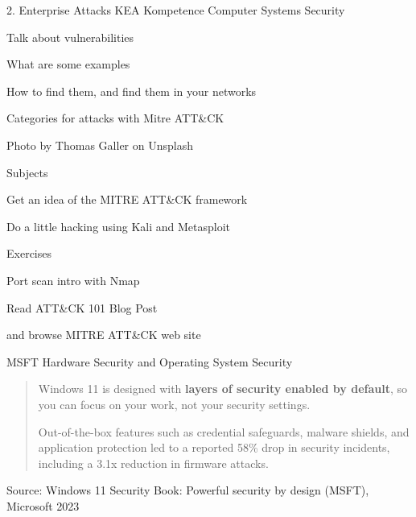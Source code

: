 \documentclass[Screen16to9,17pt]{foils}
\begin{document}
\mytitlepage
{2. Enterprise Attacks}
{KEA Kompetence Computer Systems Security \the\year}





\begin{list2}
\item Talk about vulnerabilities
\item What are some examples
\item How to find them, and find them in your networks
\item Categories for attacks with Mitre ATT\&CK
\end{list2}

{\small\hfill  Photo by Thomas Galler on Unsplash}


\begin{list1}
\item Subjects
\begin{list2}
\item Get an idea of the MITRE ATT\&CK framework
\item Do a little hacking using Kali and Metasploit
\end{list2}
\item Exercises
\begin{list2}
\item Port scan intro with Nmap
\end{list2}
\end{list1}


\begin{list1}
\item Read ATT\&CK 101 Blog Post\\
\item and browse MITRE ATT\&CK web site\\ 
\item MSFT Hardware Security and Operating System Security
\end{list1}




\begin{quote}
Windows 11 is designed with {\bf layers of security
enabled by default}, so you can focus on your work,
not your security settings.

Out-of-the-box features such as credential safeguards, malware shields, and
application protection led to a reported 58\% drop in security incidents,
including a 3.1x reduction in firmware attacks.
\end{quote}
Source: Windows 11 Security Book: Powerful security by design (MSFT), Microsoft 2023
\end{document}
